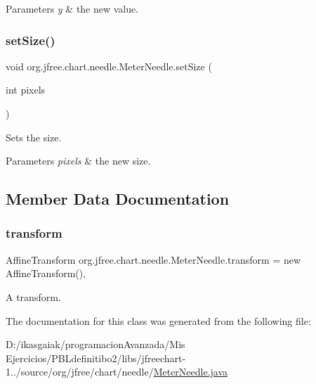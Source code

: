 \begin{DoxyParams}{Parameters}
{\em y} & the new value. \\
\hline
\end{DoxyParams}
\mbox{\label{classorg_1_1jfree_1_1chart_1_1needle_1_1_meter_needle_a19d2f9c732eacde16722b07c1af032b2}} 
\subsubsection{\texorpdfstring{set\+Size()}{setSize()}}
{\footnotesize\ttfamily void org.\+jfree.\+chart.\+needle.\+Meter\+Needle.\+set\+Size (\begin{DoxyParamCaption}\item[{int}]{pixels }\end{DoxyParamCaption})}

Sets the size.


\begin{DoxyParams}{Parameters}
{\em pixels} & the new size. \\
\hline
\end{DoxyParams}


\subsection{Member Data Documentation}
\mbox{\label{classorg_1_1jfree_1_1chart_1_1needle_1_1_meter_needle_a387dc66ab2a7ae8e9d76146b69794c68}} 
\subsubsection{\texorpdfstring{transform}{transform}}
{\footnotesize\ttfamily Affine\+Transform org.\+jfree.\+chart.\+needle.\+Meter\+Needle.\+transform = new Affine\+Transform()\hspace{0.3cm}{\ttfamily [static]}, {\ttfamily [protected]}}

A transform. 

The documentation for this class was generated from the following file\+:\begin{DoxyCompactItemize}
\item 
D\+:/ikasgaiak/programacion\+Avanzada/\+Mis Ejercicios/\+P\+B\+Ldefinitibo2/libs/jfreechart-\/1../source/org/jfree/chart/needle/\mbox{\hyperlink{_meter_needle_8java}{Meter\+Needle.\+java}}\end{DoxyCompactItemize}
